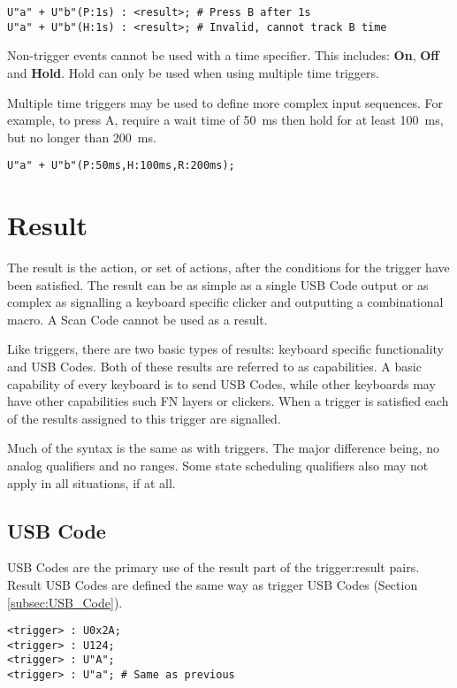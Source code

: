 \documentclass{kiibohd-template}
\begin{document}
\begin{lstlisting}
U"a" + U"b"(P:1s) : <result>; # Press B after 1s
U"a" + U"b"(H:1s) : <result>; # Invalid, cannot track B time
\end{lstlisting}

Non-trigger events cannot be used with a time specifier.
This includes: \textbf{On}, \textbf{Off} and \textbf{Hold}.
Hold can only be used when using multiple time triggers.

Multiple time triggers may be used to define more complex input sequences.
For example, to press A, require a wait time of 50~ms then hold for at least 100~ms, but no longer than 200~ms.

\begin{lstlisting}
U"a" + U"b"(P:50ms,H:100ms,R:200ms);
\end{lstlisting}


\section{Result}

The result is the action, or set of actions, after the conditions for the trigger have been satisfied.
The result can be as simple as a single USB Code output or as complex as signalling a keyboard specific clicker and outputting a combinational macro.
A Scan Code cannot be used as a result.

Like triggers, there are two basic types of results: keyboard specific functionality and USB Codes.
Both of these results are referred to as capabilities.
A basic capability of every keyboard is to send USB Codes, while other keyboards may have other capabilities such FN layers or clickers.
When a trigger is satisfied each of the results assigned to this trigger are signalled.

Much of the syntax is the same as with triggers.
The major difference being, no analog qualifiers and no ranges.
Some state scheduling qualifiers also may not apply in all situations, if at all.


\subsection{USB Code}

USB Codes are the primary use of the result part of the trigger:result pairs.
Result USB Codes are defined the same way as trigger USB Codes (Section \ref{subsec:USB_Code}).

\begin{lstlisting}
<trigger> : U0x2A;
<trigger> : U124;
<trigger> : U"A";
<trigger> : U"a"; # Same as previous
\end{lstlisting}
\end{document}
